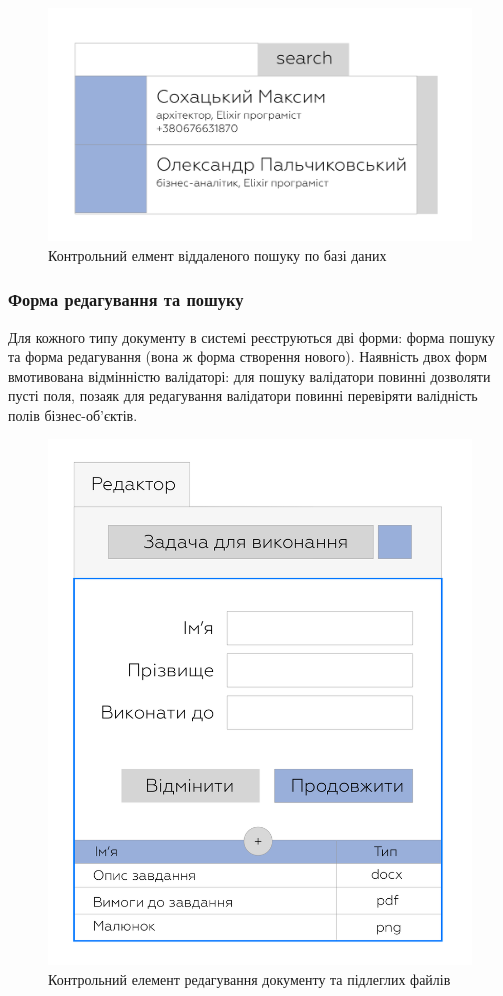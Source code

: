 \begin{figure}[!htbp]
\centerline{\includegraphics[scale=0.3]{comboLookup.png}}
\caption{Контрольний елмент віддаленого пошуку по базі даних}
\end{figure}

\subsubsection{Форма редагування та пошуку}

Для кожного типу документу в системі реєструються дві форми: форма пошуку
та форма редагування (вона ж форма створення нового). Наявність двох форм
вмотивована відмінністю валідаторі: для пошуку валідатори повинні дозволяти пусті поля,
позаяк для редагування валідатори повинні перевіряти валідність полів бізнес-об'єктів.

\begin{figure}[!htbp]
\centerline{\includegraphics[scale=0.3]{editForm.png}}
\caption{Контрольний елемент редагування документу та підлеглих файлів}
\end{figure}

